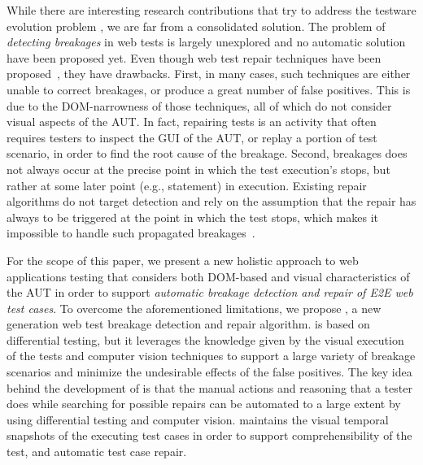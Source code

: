 While there are interesting research contributions that try to address the testware evolution problem \cite{2016-leotta-Advances,2014-leotta-WoSAR,2015-leotta-ICST,Thummalapenta:2013:ECT:2486788.2486926,Yandrapally:2014:RTA:2610384.2610390,Choudhary:2011:WWA:2002931.2002935,Hammoudi-2016-FSE}, we are far from a consolidated solution. 
The problem of \textit{detecting breakages} in web tests is largely unexplored and no automatic solution have been proposed yet. Even though web test repair techniques have been proposed~\cite{Choudhary:2011:WWA:2002931.2002935,Hammoudi-2016-FSE,2015-leotta-ICST}, they have drawbacks. 
First, in many cases, such techniques are either unable to correct breakages, or produce a great number of false positives. 
This is due to the DOM-narrowness of those techniques, all of which do not consider visual aspects of the AUT. In fact, repairing tests is an activity that often requires testers to inspect the GUI of the AUT, or replay a portion of test scenario, in order to find the root cause of the breakage.
Second, breakages does not always occur at the precise point in which the test execution's stops, but rather at some later point (e.g., statement) in execution. Existing repair algorithms do not target detection and rely on the assumption that the repair has always to be triggered at the point in which the test stops, which makes it impossible to handle such propagated breakages~\cite{Hammoudi-2016-ICST}.


For the scope of this paper, we present a new holistic approach to  web applications testing that considers both DOM-based and visual characteristics of the AUT in order to support \textit{automatic breakage detection and repair of E2E web test cases}. 
To overcome the aforementioned limitations, we propose \tool, a new generation web test breakage detection and repair algorithm. \tool is based on differential testing, but it leverages the knowledge given by the visual execution of the tests and computer vision techniques to support a large variety of breakage scenarios and minimize the undesirable effects of the false positives. The key idea behind the development of \tool is that the manual actions and reasoning that a tester does while searching for possible repairs can be automated to a large extent by using differential testing and computer vision. 
\tool maintains the visual temporal snapshots of the executing test cases in order to support comprehensibility of the test, and automatic test case repair.


